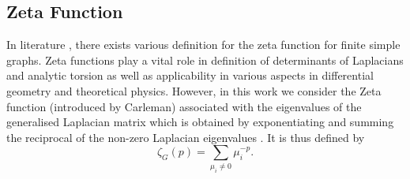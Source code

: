 \documentclass[10pt,a4paper]{article}
\theoremstyle{plain}
\theoremstyle{definition}
\begin{document}
        \subsection{Zeta Function}
        In literature \citep{knill2013zeta,friedli2017spectral}, there exists various definition for the zeta function for finite simple graphs. Zeta functions play a vital role in definition of determinants of Laplacians and analytic torsion \citep{voros1987spectral,  moscovici1991r} as well as applicability in various aspects in differential geometry and theoretical physics. However, in this work we consider the Zeta function (introduced by Carleman) associated with the eigenvalues of the generalised Laplacian matrix which is obtained by exponentiating and summing the reciprocal of the non-zero Laplacian eigenvalues \citep{friedli2017spectral}. It is thus defined by
        \begin{equation}
        \zeta_G(p) =  \sum_{\mu_{i} \neq 0} \mu_{i} ^{-p}.
        \end{equation}
             
\end{document}
